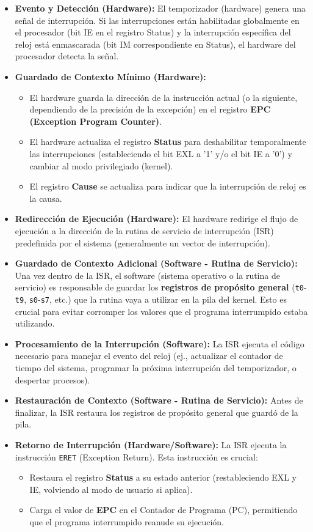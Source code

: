 \documentclass[12pt,a4paper]{article}
\begin{document}
	\begin{itemize}
		\item \textbf{Evento y Detección (Hardware):} El temporizador (hardware) genera una señal de interrupción. Si las interrupciones están habilitadas globalmente en el procesador (bit IE en el registro Status) y la interrupción específica del reloj está enmascarada (bit IM correspondiente en Status), el hardware del procesador detecta la señal.
		\item \textbf{Guardado de Contexto Mínimo (Hardware):}
		\begin{itemize}
			\item El hardware guarda la dirección de la instrucción actual (o la siguiente, dependiendo de la precisión de la excepción) en el registro \textbf{EPC (Exception Program Counter)}.
			\item El hardware actualiza el registro \textbf{Status} para deshabilitar temporalmente las interrupciones (estableciendo el bit EXL a '1' y/o el bit IE a '0') y cambiar al modo privilegiado (kernel).
			\item El registro \textbf{Cause} se actualiza para indicar que la interrupción de reloj es la causa.
		\end{itemize}
		\item \textbf{Redirección de Ejecución (Hardware):} El hardware redirige el flujo de ejecución a la dirección de la rutina de servicio de interrupción (ISR) predefinida por el sistema (generalmente un vector de interrupción).
		\item \textbf{Guardado de Contexto Adicional (Software - Rutina de Servicio):} Una vez dentro de la ISR, el software (sistema operativo o la rutina de servicio) es responsable de guardar los \textbf{registros de propósito general} (\texttt{t0}-\texttt{t9}, \texttt{s0}-\texttt{s7}, etc.) que la rutina vaya a utilizar en la pila del kernel. Esto es crucial para evitar corromper los valores que el programa interrumpido estaba utilizando.
		\item \textbf{Procesamiento de la Interrupción (Software):} La ISR ejecuta el código necesario para manejar el evento del reloj (ej., actualizar el contador de tiempo del sistema, programar la próxima interrupción del temporizador, o despertar procesos).
		\item \textbf{Restauración de Contexto (Software - Rutina de Servicio):} Antes de finalizar, la ISR restaura los registros de propósito general que guardó de la pila.
		\item \textbf{Retorno de Interrupción (Hardware/Software):} La ISR ejecuta la instrucción \texttt{ERET} (Exception Return). Esta instrucción es crucial:
		\begin{itemize}
			\item Restaura el registro \textbf{Status} a su estado anterior (restableciendo EXL y IE, volviendo al modo de usuario si aplica).
			\item Carga el valor de \textbf{EPC} en el Contador de Programa (PC), permitiendo que el programa interrumpido reanude su ejecución.
		\end{itemize}
	\end{itemize}
	
\end{document}
